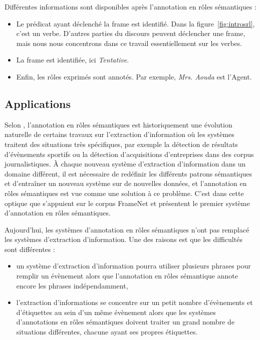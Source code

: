 Différentes informations sont disponibles après l'annotation en rôles
sémantiques :

\begin{itemize}
    \item Le prédicat ayant déclenché la frame est identifié. Dans la
        figure~\ref{fig:introsrl}, c'est un verbe. D'autres parties du
        discours peuvent déclencher une frame, mais nous nous concentrons dans
        ce travail essentiellement sur les verbes.
    \item La frame est identifiée, ici \textit{Tentative}.
    \item Enfin, les rôles exprimés sont annotés. Par exemple, \textit{Mrs.
        Aouda} est l'Agent.
\end{itemize}

\subsection{Applications}

Selon \cite{gildea2002automatic}, l'annotation en rôles sémantiques est
historiquement une évolution naturelle de certains travaux sur l'extraction
d'information où les systèmes traitent des situations très spécifiques, par
exemple la détection de résultats d'évènements sportifs ou la détection
d'acquisitions d'entreprises dans des corpus journalistiques. À chaque nouveau
système d'extraction d'information dans un domaine différent, il est nécessaire
de redéfinir les différents patrons sémantiques et d'entraîner un nouveau
système sur de nouvelles données, et l'annotation en rôles sémantiques est vue
comme une solution à ce problème. C'est dans cette optique que
\cite{gildea2002automatic} s'appuient sur le corpus FrameNet et présentent le
premier système d'annotation en rôles sémantiques.

Aujourd'hui, les systèmes d'annotation en rôles sémantiques n'ont pas remplacé
les systèmes d'extraction d'information. Une des raisons est que les
difficultés sont différentes \citep{boros2014etiquetage} :

\begin{itemize}
    \item un système d'extraction d'information pourra utiliser plusieurs
        phrases pour remplir un évènement alors que l'annotation en rôles
        sémantique annote encore les phrases indépendamment,
    \item l'extraction d'informations se concentre sur un petit nombre
        d'évènements et d'étiquettes au sein d'un même évènement alors que les
        systèmes d'annotations en rôles sémantiques doivent traiter un grand
        nombre de situations différentes, chacune ayant ses propres étiquettes.
\end{itemize}

